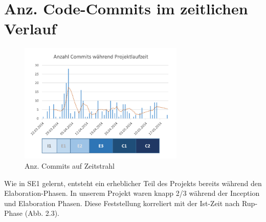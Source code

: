 	\section{Anz. Code-Commits im zeitlichen Verlauf}
        \begin{figure}
            \vspace{-25pt}
            \begin{center}
                \includegraphics[width=0.7\textwidth]{content/schlussbericht/images/commitspertime.png}
            \end{center}
            \vspace{-20pt}
            \caption{Anz. Commits auf Zeitstrahl}
        \end{figure}
        Wie in SE1 gelernt, entsteht ein erheblicher Teil des Projekts bereits während den Elaboration-Phasen. In unserem Projekt waren  knapp 2/3 während der Inception und Elaboration Phasen. Diese Feststellung korreliert mit der Ist-Zeit nach Rup-Phase (Abb. 2.3).

	